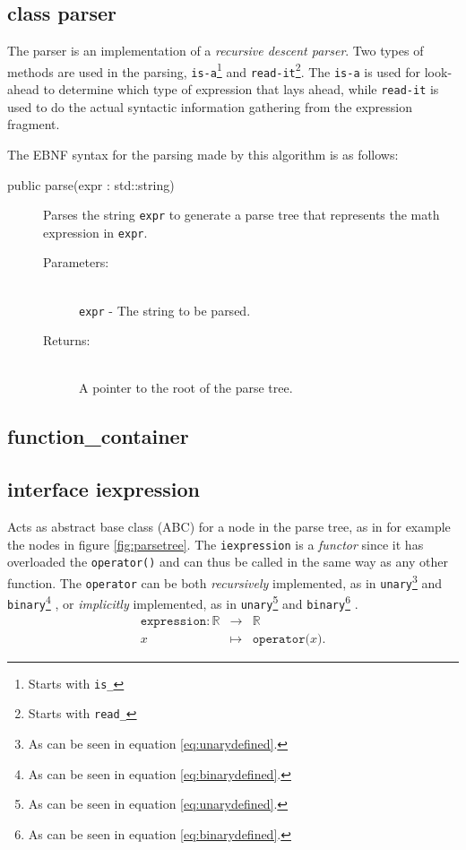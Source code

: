 \documentclass[a4paper,11pt]{kth-mag}
\newcommand{\RR}{\ensuremath{\mathbb{R}}}
\begin{document}
\subsection{class parser}
The parser is an implementation of a \emph{recursive descent parser}. Two
types of methods are used in the parsing, \texttt{is-a}\footnote{Starts with
\texttt{is\_}} and \texttt{read-it}\footnote{Starts with \texttt{read\_}}.
The \texttt{is-a} is used for look-ahead to determine which type of expression
that lays ahead, while \texttt{read-it} is used to do the actual syntactic 
information gathering from the expression fragment.

The EBNF syntax for the parsing made by this algorithm is as follows:\\


\begin{description}
    \item[public parse(expr : std::string)] Parses the string \texttt{expr} to
    generate a parse tree that represents the math expression in \texttt{expr}.
    \begin{description}
        \item[Parameters:]~\\
            \verb+expr+ - The string to be parsed.
        \item[Returns:]~\\
            A pointer to the root of the parse tree.
    \end{description}
\end{description}

\subsection{function\_container}
\subsection{interface iexpression}
\label{sec:iexpression}
Acts as abstract base class (ABC) for a node in the parse
tree, as in for example the nodes in figure \ref{fig:parsetree}. The
\texttt{iexpression} is a \emph{functor} since it has overloaded the
\texttt{operator()} and can thus be called in the same way as any other function.
The \texttt{operator} can be both 
\emph{recursively} implemented, as in
    \texttt{unary}\footnote{As can be seen in equation \ref{eq:unarydefined}.} 
    and
    \texttt{binary}\footnote{As can be seen in equation \ref{eq:binarydefined}.}
, or
\emph{implicitly} implemented, as in 
    \texttt{unary}\footnote{As can be seen in equation \ref{eq:unarydefined}.} 
    and
    \texttt{binary}\footnote{As can be seen in equation \ref{eq:binarydefined}.}
.
\begin{eqnarray}
    \label{eq:expressiondefined}
    \texttt{expression}: \RR &\rightarrow& \RR \nonumber \\
    x &\mapsto& \texttt{operator(}x\texttt{)} .
\end{eqnarray}
\end{document}
